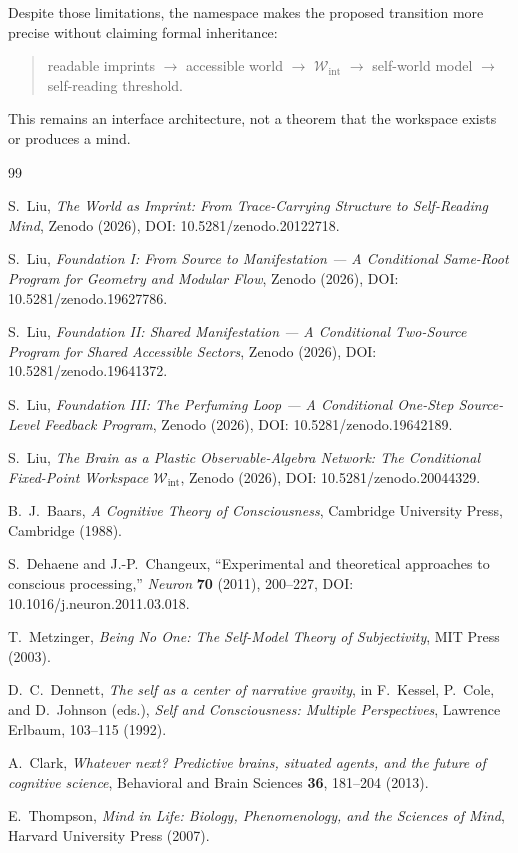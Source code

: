 \documentclass[12pt,a4paper]{article}
\begin{document}
Despite those limitations, the namespace makes the proposed transition
more precise without claiming formal inheritance:

\begin{quote}
readable imprints $\to$ accessible world $\to$
\(\mathcal W_{\mathrm{int}}\) $\to$ self-world model $\to$
self-reading threshold.
\end{quote}

This remains an interface architecture, not a theorem that the workspace
exists or produces a mind.

\begin{thebibliography}{99}

S.~Liu, \emph{The World as Imprint: From Trace-Carrying Structure to Self-Reading Mind}, Zenodo (2026), DOI: 10.5281/zenodo.20122718.

S.~Liu, \emph{Foundation I: From Source to Manifestation --- A Conditional Same-Root Program for Geometry and Modular Flow}, Zenodo (2026), DOI: 10.5281/zenodo.19627786.

S.~Liu, \emph{Foundation II: Shared Manifestation --- A Conditional Two-Source Program for Shared Accessible Sectors}, Zenodo (2026), DOI: 10.5281/zenodo.19641372.

S.~Liu, \emph{Foundation III: The Perfuming Loop --- A Conditional One-Step Source-Level Feedback Program}, Zenodo (2026), DOI: 10.5281/zenodo.19642189.

S.~Liu, \emph{The Brain as a Plastic Observable-Algebra Network: The Conditional Fixed-Point Workspace $\mathcal{W}_{\mathrm{int}}$}, Zenodo (2026), DOI: 10.5281/zenodo.20044329.

B.~J.~Baars,
\emph{A Cognitive Theory of Consciousness},
Cambridge University Press, Cambridge (1988).

S.~Dehaene and J.-P.~Changeux,
``Experimental and theoretical approaches to conscious processing,''
\emph{Neuron} \textbf{70} (2011), 200--227,
DOI: 10.1016/j.neuron.2011.03.018.

T.~Metzinger,
\emph{Being No One: The Self-Model Theory of Subjectivity},
MIT Press (2003).

D.~C.~Dennett,
\emph{The self as a center of narrative gravity},
in F.~Kessel, P.~Cole, and D.~Johnson (eds.),
\emph{Self and Consciousness: Multiple Perspectives},
Lawrence Erlbaum, 103--115 (1992).

A.~Clark,
\emph{Whatever next? Predictive brains, situated agents, and the future of cognitive science},
Behavioral and Brain Sciences \textbf{36}, 181--204 (2013).

E.~Thompson,
\emph{Mind in Life: Biology, Phenomenology, and the Sciences of Mind},
Harvard University Press (2007).

\end{thebibliography}
\end{document}
